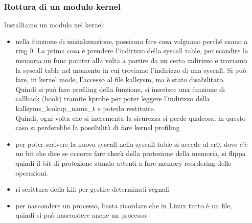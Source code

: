 \documentclass[12pt, oneside]{extbook} %
\begin{document}
\subsubsection{Rottura di un modulo kernel}
Installiamo un modulo nel kernel:
\begin{itemize}
\item nella funzione di inizializzazione, possiamo fare cosa volgiamo perché siamo a ring 0. La prima cosa è prendere l'indirizzo della syscall table, per scandire la memoria un func pointer alla volta a partire da un certo indirizzo e troviamo la syscall table nel momento in cui troviamo l'indirizzo di una syscall. Si può fare, in kernel mode, l'accesso al file kallsysm, ma è stato disabilitato.\\Quindi si può fare profiling della funzione, si inserisce una funzione di callback (hook) tramite kprobe per poter leggere l'indirizzo della kallsyms\_lookup\_name\_t e poterlo restituire.\\ Quindi, ogni volta che si incrementa la sicurezza si perde qualcosa, in questo caso si perderebbe la possibilità di fare kernel profiling
\item per poter scrivere la nuova syscall nella syscall table si accede al cr0, dove c'è un bit che dice se occorre fare check della protezione della memoria, si flippa quindi il bit di protezione stando attenti a fare memory reordering delle operazioni.
\item ri-scrittura della kill per gestire determinati segnali
\item per nascondere un processo, basta ricordare che in Linux tutto è un file, quindi si può nascondere anche un processo.
\end{itemize}
\end{document}
